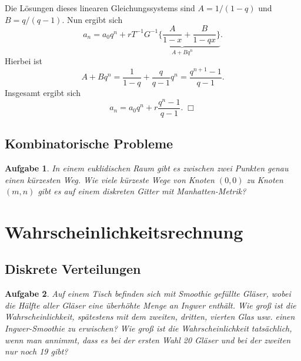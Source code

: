 \documentclass[a4paper,10pt,fleqn,twoside]{scrartcl}
\numberwithin{equation}{section}
\theoremstyle{Aufgabe}
\newtheorem{Aufgabe}{\sffamily Aufgabe}[section]
\begin{document}
Die Lösungen dieses linearen Gleichungssystems
sind $A=1/(1-q)$ und $B=q/(q-1)$. Nun ergibt sich
\[ a_n = a_0q^n + rT^{-1} \underbrace{G^{-1}\bigg\{\frac{A}{1-x} + \frac{B}{1-qx}\bigg\}}_{A+Bq^n}.\]
Hierbei ist
\[ A+Bq^n = \frac{1}{1-q}+\frac{q}{q-1}q^n = \frac{q^{n+1}-1}{q-1}.\]
Insgesamt ergibt sich
\[ a_n = a_0q^n + r\frac{q^n-1}{q-1}.\;\Box\]

\subsection{Kombinatorische Probleme}
\begin{Aufgabe}
In einem euklidischen Raum gibt es zwischen zwei Punkten genau einen
kürzesten Weg. Wie viele kürzeste Wege von Knoten $(0,0)$ zu Knoten
$(m,n)$ gibt es auf einem diskreten Gitter mit Manhatten-Metrik?
\end{Aufgabe}

\newpage
\section{Wahrscheinlichkeitsrechnung}
\subsection{Diskrete Verteilungen}
\begin{Aufgabe}
Auf einem Tisch befinden sich mit Smoothie gefüllte Gläser, wobei
die Hälfte aller Gläser eine überhöhte Menge an Ingwer enthält.
Wie groß ist die Wahrscheinlichkeit, spätestens mit dem zweiten,
dritten, vierten Glas usw. einen Ingwer-Smoothie zu erwischen?
Wie groß ist die Wahrscheinlichkeit tatsächlich, wenn man annimmt,
dass es bei der ersten Wahl 20 Gläser und bei der zweiten nur noch
19 gibt?
\end{Aufgabe}
\end{document}
